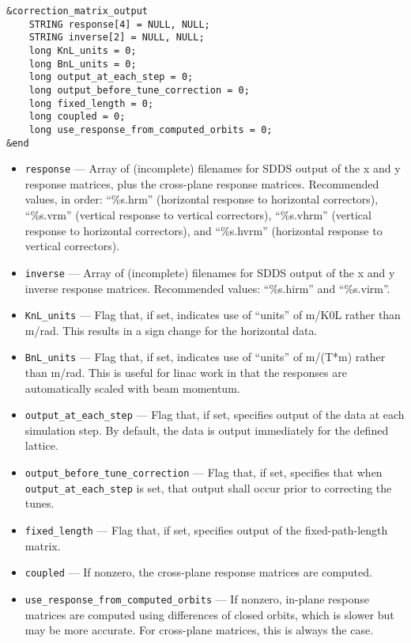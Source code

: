 \documentclass[11pt]{article}
\begin{document}
\begin{verbatim}
&correction_matrix_output
    STRING response[4] = NULL, NULL;
    STRING inverse[2] = NULL, NULL;
    long KnL_units = 0;
    long BnL_units = 0;
    long output_at_each_step = 0;
    long output_before_tune_correction = 0;
    long fixed_length = 0;
    long coupled = 0;
    long use_response_from_computed_orbits = 0;
&end
\end{verbatim}

\begin{itemize}
\item \verb|response| --- Array of (incomplete) filenames for SDDS output of the x and y response
matrices, plus the cross-plane response matrices.  Recommended values, in order: ``\%s.hrm'' (horizontal
response to horizontal correctors), ``\%s.vrm'' (vertical response to vertical correctors),
``\%s.vhrm'' (vertical response to horizontal correctors), and 
``\%s.hvrm'' (horizontal response to vertical correctors).
\item \verb|inverse| --- Array of (incomplete) filenames for SDDS output of the x and y 
inverse response matrices. Recommended values: ``\%s.hirm'' and ``\%s.virm''.
\item \verb|KnL_units| --- Flag that, if set, indicates use of ``units'' of m/K0L rather than
m/rad.  This results in a sign change for the horizontal data.
\item \verb|BnL_units| --- Flag that, if set, indicates use of ``units'' of m/(T*m) rather than
m/rad.  This is useful for linac work in that the responses are automatically scaled with 
beam momentum.
\item \verb|output_at_each_step| --- Flag that, if set, specifies output of the data at
each simulation step.  By default, the data is output immediately for the defined lattice.
\item \verb|output_before_tune_correction| --- Flag that, if set, specifies that when 
\verb|output_at_each_step| is set, that output shall occur prior to correcting the tunes.
\item \verb|fixed_length| --- Flag that, if set, specifies output of the fixed-path-length
matrix.
\item \verb|coupled| --- If nonzero, the cross-plane response matrices are computed.
\item \verb|use_response_from_computed_orbits| --- If nonzero, in-plane response matrices are computed
  using differences of closed orbits, which is slower but may be more accurate. For cross-plane matrices, this is always the case.
\end{itemize}
\end{document}
